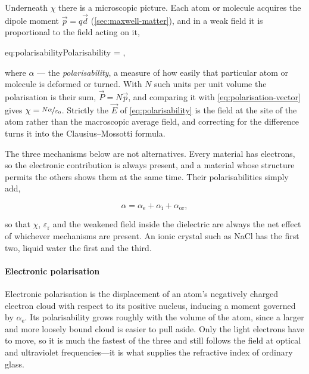         Underneath $\chi$ there is a microscopic picture. Each atom or molecule acquires the dipole moment $\vec{p} = q\vec{d}$ (\cref{sec:maxwell-matter}), and in a weak field it is proportional to the field acting on it,

        \begin{keyeq}{eq:polarisability}{Polarisability}
             = \alpha{},
        \end{keyeq}

        where $\alpha$ --- the \emph{polarisability}, a measure of how easily that particular atom or molecule is deformed or turned. With $N$ such units per unit volume the polarisation is their sum, $\vec{P} = N\vec{p}$, and comparing it with \cref{eq:polarisation-vector} gives $\chi = \nicefrac{N\alpha}{\varepsilon_{0}}$. Strictly the $\vec{E}$ of \cref{eq:polarisability} is the field at the site of the atom rather than the macroscopic average field, and correcting for the difference turns it into the Clausius--Mossotti formula.
        
        The three mechanisms below are not alternatives. Every material has electrons, so the electronic contribution is always present, and a material whose structure permits the others shows them at the same time. Their polarisabilities simply add,

        \begin{equation}\label{eq:polarisability-sum}
            \alpha = \alpha_{\text{e}} + \alpha_{\text{i}} + \alpha_{\text{or}},
        \end{equation}

        so that $\chi$, $\varepsilon_{\text{r}}$ and the weakened field inside the dielectric are always the net effect of whichever mechanisms are present. An ionic crystal such as NaCl has the first two, liquid water the first and the third.

        \paragraph{Electronic polarisation}

            Electronic polarisation is the displacement of an atom's negatively charged electron cloud with respect to its positive nucleus, inducing a moment governed by $\alpha_{\text{e}}$. Its polarisability grows roughly with the volume of the atom, since a larger and more loosely bound cloud is easier to pull aside. Only the light electrons have to move, so it is much the fastest of the three and still follows the field at optical and ultraviolet frequencies---it is what supplies the refractive index of ordinary glass.

